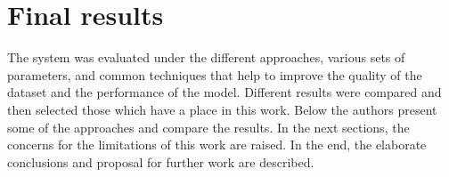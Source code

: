 \chapter{Final results}\label{ch:final-results-and-summary-discussion}
The system was evaluated under the different approaches, various sets of parameters, and common techniques that help to improve the quality of the dataset and the performance of the model.
Different results were compared and then selected those which have a place in this work.
Below the authors present some of the approaches and compare the results.
In the next sections, the concerns for the limitations of this work are raised.
In the end, the elaborate conclusions and proposal for further work are described.
